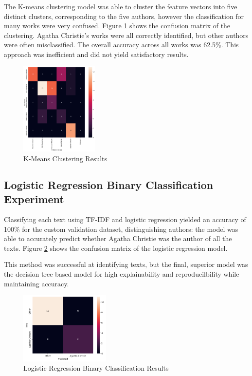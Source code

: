 \documentclass[journal]{IEEEtran} %
\begin{document}
The K-means clustering model was able to cluster the feature vectors into five distinct clusters, corresponding to the five authors, however the classification for many works were very confused. Figure \ref{kmeans} shows the confusion matrix of the clustering.
Agatha Christie's works were all correctly identified, but other authors were often misclassified. The overall accuracy across all works was 62.5\%. This approach was inefficient and did not yield satisfactory results.

\begin{figure}[h!]
    \caption{K-Means Clustering Results}
    \begin{center}
    \centerline{\includegraphics[width=0.35\textwidth]{./kmeans.png}}
    \end{center}
    \centering
    \label{kmeans}
\end{figure}

\subsection{Logistic Regression Binary Classification Experiment}

Classifying each text using TF-IDF and logistic regression yielded an accuracy of 100\% for the custom validation dataset, distinguishing authors: the model was able to accurately predict whether Agatha Christie was the author of all the texts. Figure \ref{logreg} shows the confusion matrix of the logistic regression model.

This method was successful at identifying texts, but the final, superior model was the decision tree based model for high explainability and reproducilbility while maintaining accuracy.

\begin{figure}[h!]
    \caption{Logistic Regression Binary Classification Results}
    \begin{center}
    \centerline{\includegraphics[width=0.4\textwidth]{./logreg.png}}
    \end{center}
    \centering
    \label{logreg}
\end{figure}
\end{document}
